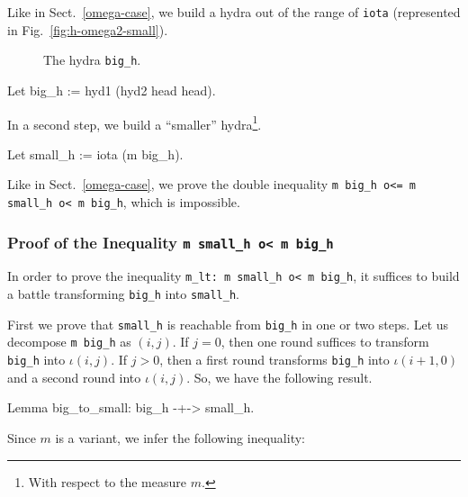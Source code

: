 Like in Sect.~\ref{omega-case}, we build a hydra out of the range of \texttt{iota} (represented in Fig.~\vref{fig:h-omega2-small}).

\begin{figure}[htb]
\centering
{}
\caption{\label{fig:h-omega2-small}}
 The hydra \texttt{big\_h}.
\end{figure}


\begin{Coqsrc}
   Let big_h := hyd1 (hyd2 head head).  
\end{Coqsrc}
 
 In a second step, we build a ``smaller'' hydra\footnote{With respect to the measure $m$.}.
 
\begin{Coqsrc}
   Let small_h := iota (m big_h).
\end{Coqsrc}

Like in Sect.~\ref{omega-case}, we prove the double inequality \texttt{m big\_h o<= m small\_h o< m big\_h}, which is impossible.

\subsubsection{Proof of the Inequality \texttt{m small\_h o< m big\_h}}

In order to prove the inequality  \texttt{m\_lt: m small\_h o< m big\_h}, it suffices to
build a battle transforming \texttt{big\_h} into \texttt{small\_h}.

First we prove that \texttt{small\_h} is reachable from \texttt{big\_h} in one or two steps. Let us decompose \texttt{m big\_h} as $(i,j)$.
If $j=0$, then one round suffices to transform \texttt{big\_h} into $\iota(i,j)$.
If $j>0$, then a first round transforms \texttt{big\_h} into $\iota(i+1,0)$ and a second round into $\iota(i,j)$. So, we have the following result.

\begin{Coqsrc}
  Lemma big_to_small: big_h -+-> small_h.
\end{Coqsrc}

Since $m$ is a variant, we infer the following inequality:

